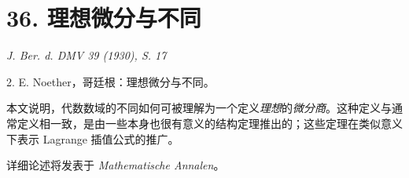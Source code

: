 \documentclass[11pt]{article}
\begin{document}
\section*{36. 理想微分与不同}

\begin{center}
\emph{J. Ber. d. DMV 39 (1930), S. 17}
\end{center}

2. E. Noether，哥廷根：理想微分与不同。

本文说明，代数数域的不同如何可被理解为一个定义\emph{理想}的\emph{微分商}。这种定义与通常定义相一致，是由一些本身也很有意义的结构定理推出的；这些定理在类似意义下表示 Lagrange 插值公式的推广。

详细论述将发表于 \emph{Mathematische Annalen}。
\end{document}
